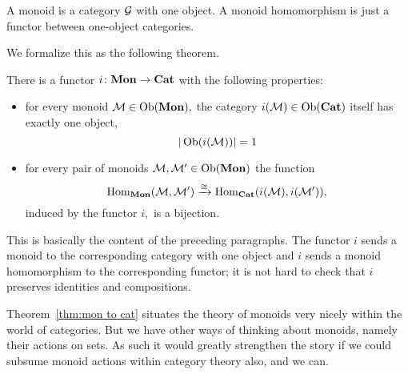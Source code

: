 \documentclass[../main/CT4S-EN-RU]{subfiles}
\begin{document}
\begin{blockRUS}
\end{blockRUS}

\begin{sloganENG}
A monoid is a category $\mathcal{G}$ with one object. A monoid homomorphism is just a functor between one-object categories.
\end{sloganENG}

\begin{sloganRUS}
\end{sloganRUS}

\begin{blockENG}
We formalize this as the following theorem.
\end{blockENG}

\begin{blockRUS}
\end{blockRUS}

\begin{theoremENG}\label{thm:mon to cat}
There is a functor $i\colon{\mathbf{Mon}}\rightarrow{\mathbf{Cat}}$ with the following properties:
\begin{itemize}
\item for every monoid $\mathcal{M}\in\operatorname{Ob}({\mathbf{Mon}}),$ the category $i(\mathcal{M})\in\operatorname{Ob}({\mathbf{Cat}})$ itself has exactly one object, $$|\operatorname{Ob}(i(\mathcal{M}))|=1$$ 
\item for every pair of monoids $\mathcal{M},\mathcal{M}'\in\operatorname{Ob}({\mathbf{Mon}})$ the function $$\operatorname{Hom}_{\mathbf{Mon}}(\mathcal{M},\mathcal{M}')\xrightarrow{\cong}\operatorname{Hom}_{\mathbf{Cat}}(i(\mathcal{M}),i(\mathcal{M}')),$$ induced by the functor $i,$ is a bijection.
\end{itemize}
\end{theoremENG}

\begin{theoremRUS}\label{thm:mon to cat}
\end{theoremRUS}

\begin{proofENG}
This is basically the content of the preceding paragraphs. The functor $i$ sends a monoid to the corresponding category with one object and $i$ sends a monoid homomorphism to the corresponding functor; it is not hard to check that $i$ preserves identities and compositions.
\end{proofENG}

\begin{proofRUS}
\end{proofRUS}

\begin{blockENG}
Theorem~\ref{thm:mon to cat} situates the theory of monoids very nicely within the world of categories. But we have other ways of thinking about monoids, namely their actions on sets. As such it would greatly strengthen the story if we could subsume monoid actions within category theory also, and we can.
\end{blockENG}
\end{document}
